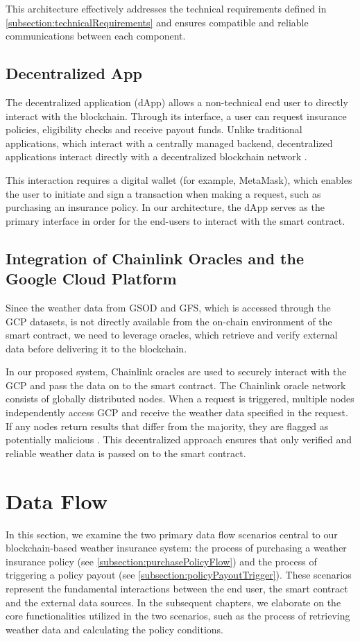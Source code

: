 This architecture effectively addresses the technical requirements defined in \cref{subsection:technicalRequirements} and ensures compatible and reliable communications between each component.

\subsection{Decentralized App}\label{subsection:decentralizedApp}
The decentralized application (dApp) allows a non-technical end user to directly interact with the blockchain. Through its interface, a user can request insurance policies, eligibility checks and receive payout funds. Unlike traditional applications, which interact with a centrally managed backend, decentralized applications interact directly with a decentralized blockchain network \autocite{Wu2019A}.

This interaction requires a digital wallet (for example, MetaMask), which enables the user to initiate and sign a transaction when making a request, such as purchasing an insurance policy. In our architecture, the dApp serves as the primary interface in order for the end-users to interact with the smart contract. 

\subsection{Integration of Chainlink Oracles and the Google Cloud Platform}\label{subsection:ChainlinkOracle}
Since the weather data from GSOD and GFS, which is accessed through the GCP datasets, is not directly available from the on-chain environment of the smart contract, we need to leverage oracles, which retrieve and verify external data before delivering it to the blockchain.

In our proposed system, Chainlink oracles are used to securely interact with the GCP and pass the data on to the smart contract. The Chainlink oracle network consists of globally distributed nodes. When a request is triggered, multiple nodes independently access GCP and receive the weather data specified in the request. If any nodes return results that differ from the majority, they are flagged as potentially malicious \autocite{breidenbach2021chainlink}. This decentralized approach ensures that only verified and reliable weather data is passed on to the smart contract.

\section{Data Flow}
In this section, we examine the two primary data flow scenarios central to our blockchain-based weather insurance system: the process of purchasing a weather insurance policy (see \cref{subsection:purchasePolicyFlow}) and the process of triggering a policy payout (see \cref{subsection:policyPayoutTrigger}). These scenarios represent the fundamental interactions between the end user, the smart contract and the external data sources. In the subsequent chapters, we elaborate on the core functionalities utilized in the two scenarios, such as the process of retrieving weather data and calculating the policy conditions.

